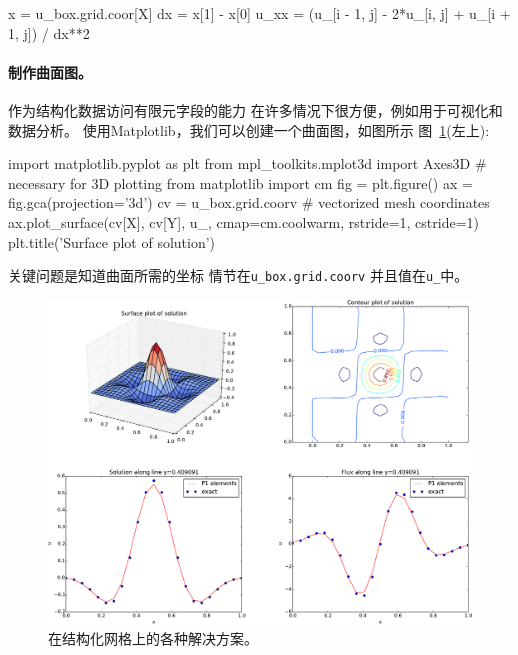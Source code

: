 \begin{python}
x = u_box.grid.coor[X]
dx = x[1] - x[0]
u_xx = (u_[i - 1, j] - 2*u_[i, j] + u_[i + 1, j]) / dx**2
\end{python}


\paragraph{制作曲面图。}
作为结构化数据访问有限元字段的能力
在许多情况下很方便，例如用于可视化和数据分析。
使用Matplotlib，我们可以创建一个曲面图，如图所示
图~\ref{ftut:structviz:fig1}(左上):

\begin{python}
import matplotlib.pyplot as plt
from mpl_toolkits.mplot3d import Axes3D  # necessary for 3D plotting
from matplotlib import cm
fig = plt.figure()
ax = fig.gca(projection='3d')
cv = u_box.grid.coorv  # vectorized mesh coordinates
ax.plot_surface(cv[X], cv[Y], u_, cmap=cm.coolwarm,
                rstride=1, cstride=1)
plt.title('Surface plot of solution')
\end{python}
关键问题是知道曲面所需的坐标
情节在\verb!u_box.grid.coorv! 并且值在\verb!u_!中。

\begin{figure}[!ht]  %
 \centerline{\includegraphics[width=0.95\linewidth]{fig/poisson_extended.pdf}}
 \caption{
 在结构化网格上的各种解决方案。\label{ftut:structviz:fig1}
 }
\end{figure}



